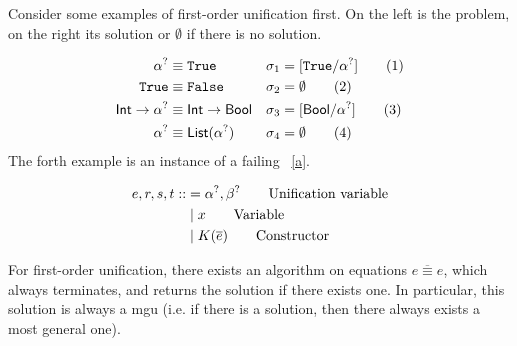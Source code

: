 \documentclass[twoside,12pt,a4paper]{article}
\begin{document}
Consider some examples of first-order unification first. On the left is the problem, on the right its solution or $\emptyset$ if there is no solution.
\begin{example}
    \begin{align*}
        \alpha^? &\equiv \mathtt{True} &\sigma_1 &= [\mathtt{True}/\alpha^?]\tag{1}\\
        \mathtt{True} &\equiv \mathtt{False} &\sigma_2 &= \emptyset\tag{2}\\
        \mathsf{Int} \rightarrow \alpha^? &\equiv \mathsf{Int} \rightarrow \mathsf{Bool} &\sigma_3 &= [\mathsf{Bool}/\alpha^?]\tag{3}\\
        \alpha^?&\equiv \mathsf{List(\alpha^?)} &\sigma_4 &= \emptyset\tag{4}
    \end{align*}
    The forth example is an instance of a failing ~\ref{a}.
\end{example}

\begin{definition}
\begin{align*}
    e,r,s,t ::&= \alpha^?, \beta^? \tag*{Unification variable}\\
    &\;|\; x\tag*{Variable} \\
    &\;|\; K(\overline{e}) \tag*{Constructor}
\end{align*}
\end{definition}

\begin{theorem}
    For first-order unification, there exists an algorithm on equations $\overline{e\equiv e}$, which always terminates, and returns the solution if there exists one. 
    In particular, this solution is always a mgu (i.e. if there is a solution, then there always exists a most general one).
\end{theorem}
\end{document}
